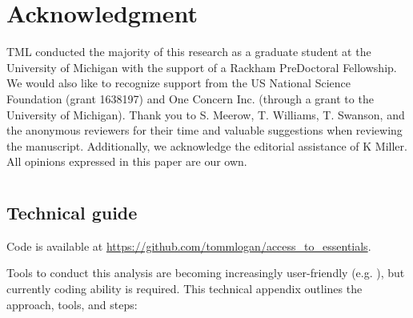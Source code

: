 \documentclass[onecolumn,doublespacing]{risa}
\let \citeA \textcite
\begin{document}
\backmatter

\section*{Acknowledgment}
TML conducted the majority of this research as a graduate student at the University of Michigan with the support of a Rackham PreDoctoral Fellowship.
We would also like to recognize support from the US National Science Foundation (grant 1638197) and One Concern Inc. (through a grant to the University of Michigan). 
Thank you to S. Meerow, T. Williams, T. Swanson, and the anonymous reviewers for their time and valuable suggestions when reviewing the manuscript.
Additionally, we acknowledge the editorial assistance of K Miller. 
All opinions expressed in this paper are our own.

\printbibliography

\appendix
\renewcommand\thefigure{A.\arabic{figure}} 

\section{}
\subsection{Technical guide}
\noindent Code is available at \url{https://github.com/tommlogan/access_to_essentials}.


Tools to conduct this analysis are becoming increasingly user-friendly (e.g. \citeA{noel2019-pypi}), but currently coding ability is required. This technical appendix outlines the approach, tools, and steps:
\end{document}

